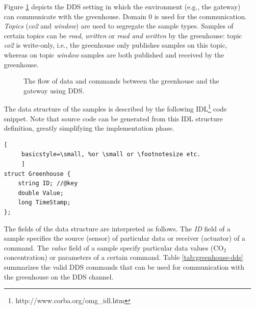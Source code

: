 \documentclass[a4paper, 11pt]{article}
\begin{document}
	Figure \ref{fig:greenhouse} depicts the DDS setting in which the environment (e.g., the gateway) can communicate with the greenhouse. Domain 0 is used for the communication. \emph{Topics} (\textsl{co2} and \textsl{window}) are used to segregate the sample types. Samples of certain topics can be \emph{read}, \emph{written} or \emph{read and written} by the greenhouse: topic \textsl{co2} is write-only, i.e., the greenhouse only publishes samples on this topic, whereas on topic \textsl{window} samples are both published and received by the greenhouse.
	
	\begin{figure}[h!]
		\center
		\caption{The flow of data and commands between the greenhouse and the gateway using DDS.}
		\label{fig:greenhouse}
	\end{figure}
	
	 The data structure of the samples is described by the following IDL\footnote{http://www.corba.org/omg\_idl.htm} code snippet. Note that source code can be generated from this IDL structure definition, greatly simplifying the implementation phase.
	 \begin{lstlisting}[
	 basicstyle=\small, %or \small or \footnotesize etc.
	 ]
struct Greenhouse {
    string ID; //@key
    double Value;
    long TimeStamp;
};
	 \end{lstlisting}
	 
	 The fields of the data structure are interpreted as follows. The \emph{ID} field of a sample specifies the source (sensor) of particular data or receiver (actuator) of a command. The \emph{value} field of a sample specify particular data values (CO$_2$ concentration) or parameters of a certain command. Table \ref{tab:greenhouse-dds} summarizes the valid DDS commands that can be used for communication with the greenhouse on the DDS channel.
	
\end{document}
